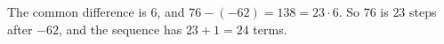 The common difference is $6$, and $76-(-62)=138=23\cdot6$. So $76$ is $23$ steps after $-62$, and the sequence has $23+1=\boxed{24}$ terms.
